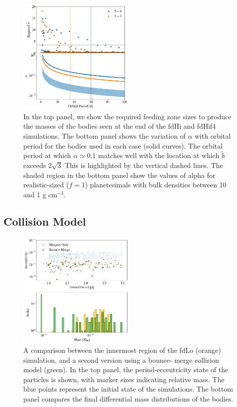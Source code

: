 \documentclass[twocolumn,linenumbers]{aastex63}
\begin{document}
\begin{figure}
\begin{center}
    \includegraphics[width=0.5\textwidth]{figures/f6f4_b.png}
    \caption{In the top panel, we show the required feeding zone sizes to produce the masses of the bodies seen
    at the end of the fdHi and fdHif4 simulations.  The bottom panel shows the variation of $\alpha$ with orbital period for the 
    bodies used in each case (solid curves). The orbital period at which $\alpha \simeq 0.1$ matches well with the location at 
    which $\tilde{b}$ exceeds $2 \sqrt{3}$ This is highlighted by the vertical dashed lines. The shaded region
    in the bottom panel show the values of alpha for realistic-sized ($f=1$) planetesimals with bulk densities between 10 and 1 g cm$^{-3}$.\label{fig:f6f4_b}}
\end{center}
\end{figure}

\subsection{Collision Model}

\begin{figure}
\begin{center}
    \includegraphics[width=0.5\textwidth]{figures/frag_ecc.png}
    \caption{A comparison between the innermost region of the fdLo (orange) simulation, and a second version using a bounce-
    merge collision model (green). In the top panel, the period-eccentricity state of the particles is shown, with marker sizes 
    indicating relative mass. The blue points represent the initial state of the simulations. The bottom panel compares the final 
    differential mass distributions of the bodies. \label{fig:frag_ecc}}
\end{center}
\end{figure}
\end{document}
